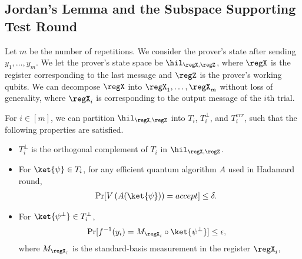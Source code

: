 \subsection{Jordan's Lemma and the Subspace Supporting Test Round}




Let $m$ be the number of repetitions. We consider the prover's state after sending $y_1,\dots,y_m$. We let the prover's state space be $\hil_{\regX,\regZ}$, where $\regX$ is the register corresponding to the last message and $\regZ$ is the prover's working qubits. We can decompose $\regX$ into $\regX_1,\dots,\regX_m$ without loss of generality, where $\regX_i$ is corresponding to the output message of the $i$th trial.     


\begin{lemma}\label{lem:test_subspace}
For $i\in [m]$, we can partition $\hil_{\regX,\regZ}$ into $T_i$, $T^{\bot}_i$, and $T^{err}_i$, such that the following properties are satisfied. 
\begin{itemize}
    \item $T^{\bot}_i$ is the orthogonal complement of $T_i$ in $\hil_{\regX,\regZ}$.
    \item For $\ket{\psi}\in T_i$, for any efficient quantum algorithm $A$ used in Hadamard round, 
    \begin{align*}
        &\Pr[V\left(A(\ket{\psi})\right)=accept]\leq \delta. 
    \end{align*} 
    \item For $\ket{\psi^{\bot}}\in T^{\bot}_i$, 
    \begin{align*}
        &\Pr[f^{-1}(y_i)=M_{\regX_i}\circ\ket{\psi^{\bot}}]\leq \epsilon,  
    \end{align*}
    where $M_{\regX_i}$ is the standard-basis measurement in the register $\regX_i$, 
\end{itemize}
\end{lemma}

